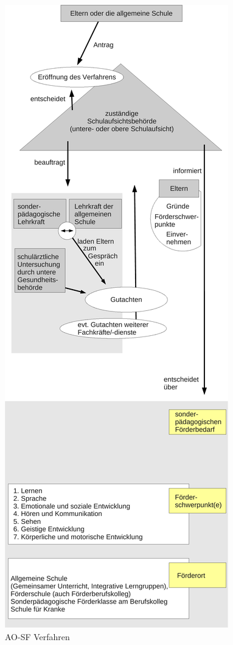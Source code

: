 \begin{figure}[htbp]
\centering
\includegraphics[width=\ScaleIfNeeded]{AO-SF.pdf}%
\caption{AO-SF Verfahren}%
\label{AO-SF Verfahren}
\end{figure}
